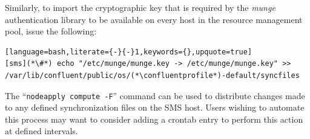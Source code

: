 \noindent Similarly, to import the
cryptographic
key
that is required by the {\em munge}
authentication library to be available on every host in the resource management
pool, issue the following:

\begin{lstlisting}[language=bash,literate={-}{-}1,keywords={},upquote=true]
[sms](*\#*) echo "/etc/munge/munge.key -> /etc/munge/munge.key" >> /var/lib/confluent/public/os/(*\confluentprofile*)-default/syncfiles
\end{lstlisting}

\begin{center}
\begin{tcolorbox}[]
\small
The ``\texttt{nodeapply compute -F}'' command can be used to distribute changes made to any
defined synchronization files on the SMS host. Users wishing to automate this process may
want to consider adding a crontab entry to perform this action at defined intervals.
\end{tcolorbox}
\end{center}
